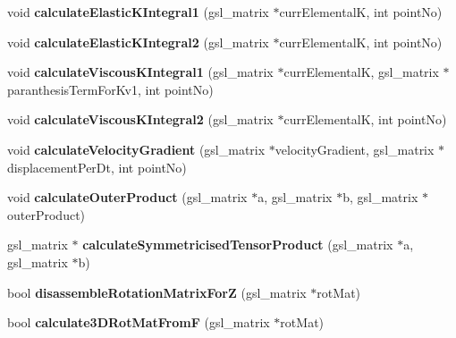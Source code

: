 \begin{DoxyCompactItemize}
\item 
\hypertarget{classShapeBase_abb02278c3894e00fdbc0cd2e379111ce}{}void {\bfseries calculate\+Elastic\+K\+Integral1} (gsl\+\_\+matrix $\ast$curr\+Elemental\+K, int point\+No)\label{classShapeBase_abb02278c3894e00fdbc0cd2e379111ce}

\item 
\hypertarget{classShapeBase_a74a5f7382e5d4038e4396d3f4a198105}{}void {\bfseries calculate\+Elastic\+K\+Integral2} (gsl\+\_\+matrix $\ast$curr\+Elemental\+K, int point\+No)\label{classShapeBase_a74a5f7382e5d4038e4396d3f4a198105}

\item 
\hypertarget{classShapeBase_a5cdcb5b445291f28d3ed3d83c582f534}{}void {\bfseries calculate\+Viscous\+K\+Integral1} (gsl\+\_\+matrix $\ast$curr\+Elemental\+K, gsl\+\_\+matrix $\ast$paranthesis\+Term\+For\+Kv1, int point\+No)\label{classShapeBase_a5cdcb5b445291f28d3ed3d83c582f534}

\item 
\hypertarget{classShapeBase_a9795e5aad1361070df5ecdd735d9361b}{}void {\bfseries calculate\+Viscous\+K\+Integral2} (gsl\+\_\+matrix $\ast$curr\+Elemental\+K, int point\+No)\label{classShapeBase_a9795e5aad1361070df5ecdd735d9361b}

\item 
\hypertarget{classShapeBase_a858ee3ff9bc490dc6584741f786c9478}{}void {\bfseries calculate\+Velocity\+Gradient} (gsl\+\_\+matrix $\ast$velocity\+Gradient, gsl\+\_\+matrix $\ast$displacement\+Per\+Dt, int point\+No)\label{classShapeBase_a858ee3ff9bc490dc6584741f786c9478}

\item 
\hypertarget{classShapeBase_ac4a71f51dacb8bdf18e1a9914e763016}{}void {\bfseries calculate\+Outer\+Product} (gsl\+\_\+matrix $\ast$a, gsl\+\_\+matrix $\ast$b, gsl\+\_\+matrix $\ast$outer\+Product)\label{classShapeBase_ac4a71f51dacb8bdf18e1a9914e763016}

\item 
\hypertarget{classShapeBase_a07e84b37967dd936115bd1adb75a0fd2}{}gsl\+\_\+matrix $\ast$ {\bfseries calculate\+Symmetricised\+Tensor\+Product} (gsl\+\_\+matrix $\ast$a, gsl\+\_\+matrix $\ast$b)\label{classShapeBase_a07e84b37967dd936115bd1adb75a0fd2}

\item 
\hypertarget{classShapeBase_a91a660608ede71c5bfdd1c4956843760}{}bool {\bfseries disassemble\+Rotation\+Matrix\+For\+Z} (gsl\+\_\+matrix $\ast$rot\+Mat)\label{classShapeBase_a91a660608ede71c5bfdd1c4956843760}

\item 
\hypertarget{classShapeBase_a9b249ac3da27e7eeb6e0604a76f15faf}{}bool {\bfseries calculate3\+D\+Rot\+Mat\+From\+F} (gsl\+\_\+matrix $\ast$rot\+Mat)\label{classShapeBase_a9b249ac3da27e7eeb6e0604a76f15faf}

\end{DoxyCompactItemize}
